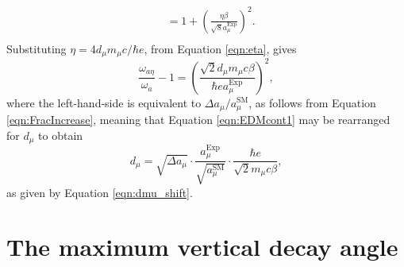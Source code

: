 \begin{appendices}
\begin{equation}
\begin{aligned}
& = 1 + \left(\frac{\eta \beta}{\sqrt{8}a_{\mu}^{\text{Exp}}}\right)^{2}. \\ 
\end{aligned}
\end{equation}
%
Substituting $\eta=4d_{\mu}m_{\mu}c/\hbar e$, from Equation \ref{eqn:eta}, gives
%
\begin{equation}
\frac{\omega_{a\eta}}{\omega_{a}} -1 = \left(\frac{\sqrt{2}d_{\mu}m_{\mu} c \beta }{\hbar e a_{\mu}^{\text{Exp}} }\right)^{2},
\label{eqn:EDMcont1}
\end{equation}
%
where the left-hand-side is equivalent to $\Delta a_{\mu}/a_{\mu}^{\text{SM}}$, as follows from Equation \ref{eqn:FracIncrease}, meaning that Equation \ref{eqn:EDMcont1} may be rearranged for $d_{\mu}$ to obtain 
%
\begin{equation}
    d_{\mu} = \sqrt{\Delta a_{\mu}}\cdot \frac{a_{\mu}^{\text{Exp}}}{\sqrt{a_{\mu}^{\text{SM}}}} \cdot\frac{\hbar e }{\sqrt{2}m_{\mu} c \beta },
\end{equation}
%
as given by Equation \ref{eqn:dmu_shift}.


\chapter[The maximum vertical decay angle]{The maximum vertical decay angle}\label{app:MaxVertAngle}


\end{appendices}
